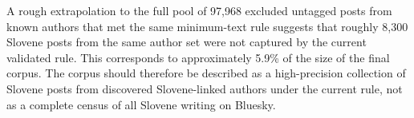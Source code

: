 A rough extrapolation to the full pool of 97,968 excluded untagged posts from known authors that met the same minimum-text rule suggests that roughly 8,300 Slovene posts from the same author set were not captured by the current validated rule. This corresponds to approximately 5.9\% of the size of the final corpus. The corpus should therefore be described as a high-precision collection of Slovene posts from discovered Slovene-linked authors under the current rule, not as a complete census of all Slovene writing on Bluesky.
